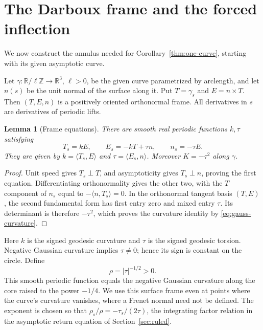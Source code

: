 \documentclass[11pt]{amsart}
\newtheorem{lemma}[theorem]{Lemma}
\theoremstyle{definition}
\newcommand{\R}{\mathbb R}
\begin{document}
\section{The Darboux frame and the forced inflection}\label{sec:frame}

We now construct the annulus needed for
Corollary~\ref{thm:one-curve}, starting with its given asymptotic curve.

Let $\gamma:\R/\ell\mathbb Z\to\R^3$, $\ell>0$, be the given curve
parametrized by arclength, and let $n(s)$ be the unit normal of
the surface along it. Put $T=\gamma_s$ and $E=n\times T$.
Then $(T,E,n)$ is a positively oriented orthonormal frame.
All derivatives in $s$ are derivatives of periodic lifts.

\begin{lemma}[Frame equations]\label{lem:frame}
There are smooth real periodic functions $k,\tau$ satisfying
\begin{equation}\label{eq:darboux}
 T_s=kE,\qquad E_s=-kT+\tau n,\qquad n_s=-\tau E.
\end{equation}
They are given by $k=\langle T_s,E\rangle$ and
$\tau=\langle E_s,n\rangle$. Moreover $K=-\tau^2$ along $\gamma$.
\end{lemma}
\begin{proof}
Unit speed gives $T_s\perp T$, and asymptoticity gives
$T_s\perp n$, proving the first equation.
Differentiating orthonormality gives the other two, with the
$T$ component of $n_s$ equal to
$-\langle n,T_s\rangle=0$.
In the orthonormal tangent basis $(T,E)$, the second fundamental
form has first entry zero and mixed entry $\tau$.
Its determinant is therefore $-\tau^2$, which proves the curvature
identity by \eqref{eq:gauss-curvature}.
\end{proof}

Here $k$ is the signed geodesic curvature and $\tau$ is the signed
geodesic torsion. Negative Gaussian curvature implies $\tau\ne0$;
hence its sign is constant on the circle. Define
\begin{equation}\label{eq:rho}
 \rho=|\tau|^{-1/2}>0.
\end{equation}
This smooth periodic function equals the negative Gaussian curvature
along the core raised to the power $-1/4$.
We use this surface frame even
at points where the curve's curvature vanishes, where a Frenet
normal need not be defined.
The exponent is chosen so that
$\rho_s/\rho=-\tau_s/(2\tau)$, the integrating factor relation
in the asymptotic return equation of Section~\ref{sec:ruled}.
\end{document}
